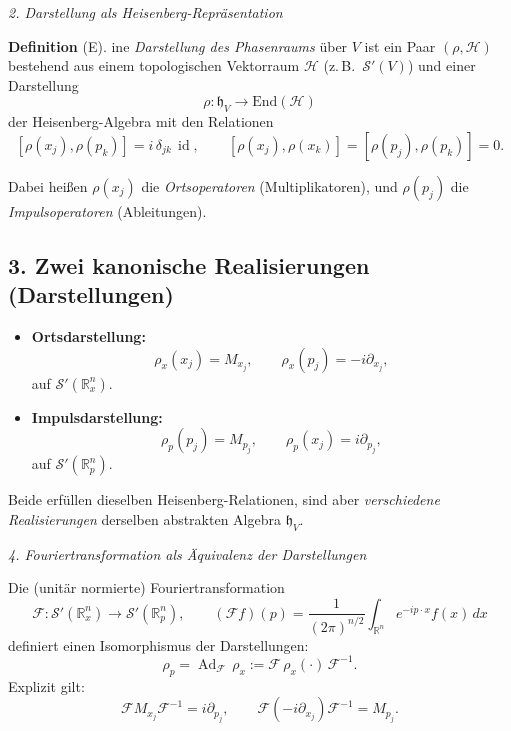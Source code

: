 \documentclass[10pt, letterpaper]{article}
\newcommand{\id}{\operatorname{id}}
\newcommand{\Ad}{\operatorname{Ad}}
\newcommand{\R}{\mathbb{R}}
\newcommand{\End}{\mathrm{End}}
\newcommand{\CustomHeading}[3]{%
  \par\medskip\noindent%
  \textbf{#1 #2} \textnormal{(#3)}.\enskip%
}
\newenvironment{DEF}[2]{\begin{unitbox}\CustomHeading{Definition}{#1}{#2}}{\end{unitbox}}
\begin{document}
\emph{2. Darstellung als Heisenberg-Repräsentation}

\begin{DEF}{}
Eine \emph{Darstellung des Phasenraums} über $V$ ist ein Paar $(\rho,\mathcal{H})$ bestehend aus
einem topologischen Vektorraum $\mathcal{H}$ (z.\,B.\ $\mathcal{S}'(V)$) und einer Darstellung
\[
\rho:\mathfrak{h}_V\longrightarrow \End(\mathcal{H})
\]
der Heisenberg-Algebra mit den Relationen
\[
[\rho(x_j),\rho(p_k)]=i\,\delta_{jk}\,\id,\qquad
[\rho(x_j),\rho(x_k)]=[\rho(p_j),\rho(p_k)]=0.
\]
\end{DEF}

\noindent
Dabei heißen $\rho(x_j)$ die \emph{Ortsoperatoren} (Multiplikatoren), und $\rho(p_j)$ die \emph{Impulsoperatoren} (Ableitungen).

\subsection*{3. Zwei kanonische Realisierungen (Darstellungen)}

\begin{itemize}
\item \textbf{Ortsdarstellung:}
\[
\rho_x(x_j)=M_{x_j},\qquad \rho_x(p_j)=-i\partial_{x_j},
\]
auf $\mathcal{S}'(\R^n_x)$.

\item \textbf{Impulsdarstellung:}
\[
\rho_p(p_j)=M_{p_j},\qquad \rho_p(x_j)=i\partial_{p_j},
\]
auf $\mathcal{S}'(\R^n_p)$.
\end{itemize}

\noindent
Beide erfüllen dieselben Heisenberg-Relationen, sind aber \emph{verschiedene Realisierungen}
derselben abstrakten Algebra $\mathfrak{h}_V$.

\emph{4. Fouriertransformation als Äquivalenz der Darstellungen}

Die (unitär normierte) Fouriertransformation
\[
\mathcal{F}:\mathcal{S}'(\R^n_x)\longrightarrow\mathcal{S}'(\R^n_p),
\qquad
(\mathcal{F}f)(p)=\frac{1}{(2\pi)^{n/2}}\int_{\R^n}e^{-ip\cdot x}f(x)\,dx
\]
definiert einen Isomorphismus der Darstellungen:
\[
\boxed{\ \rho_p = \Ad_{\mathcal{F}}\,\rho_x := \mathcal{F}\,\rho_x(\cdot)\,\mathcal{F}^{-1}. \ }
\]
Explizit gilt:
\[
\mathcal{F} M_{x_j} \mathcal{F}^{-1} = i\partial_{p_j},\qquad
\mathcal{F}(-i\partial_{x_j})\mathcal{F}^{-1}=M_{p_j}.
\]

\begin{center}
\end{center}
\end{document}
